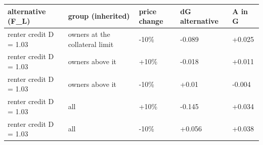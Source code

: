 \begingroup\small
\setlength{\tabcolsep}{3pt}
\renewcommand{\arraystretch}{1.04}
\begin{tabularx}{\linewidth}{XXXXX}
\toprule
alternative (F\_L) & group (inherited) & price change & dG alternative & A in G \\
\midrule
renter credit D = 1.03 & owners at the collateral limit & -10\% & -0.089 & +0.025 \\
renter credit D = 1.03 & owners above it & +10\% & -0.018 & +0.011 \\
renter credit D = 1.03 & owners above it & -10\% & +0.01 & -0.004 \\
renter credit D = 1.03 & all & +10\% & -0.145 & +0.034 \\
renter credit D = 1.03 & all & -10\% & +0.056 & +0.038 \\
\bottomrule
\end{tabularx}
\endgroup
